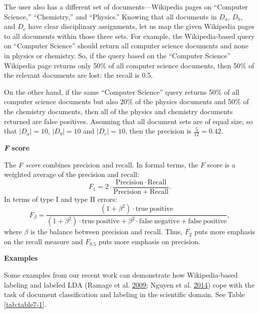 \documentclass[]{krantz}
\begin{document}
The user also has a different set of documents---Wikipedia pages on
``Computer Science,'' ``Chemistry,'' and ``Physics.'' Knowing that all
documents in \(D_a\), \(D_b\), and \(D_c\) have clear disciplinary
assignments, let us map the given Wikipedia pages to all documents
within those three sets. For example, the Wikipedia-based query on
``Computer Science'' should return all computer science documents and
none in physics or chemistry. So, if the query based on the ``Computer
Science'' Wikipedia page returns only 50\% of all computer science
documents, then 50\% of the relevant documents are lost: the recall is
0.5.

On the other hand, if the same ``Computer Science'' query returns 50\%
of all computer science documents but also 20\% of the physics documents
and 50\% of the chemistry documents, then all of the physics and
chemistry documents returned are false positives. Assuming that all
document sets are of equal size, so that \(|D_a| = 10\), \(|D_b|=10\)
and \(|D_c| = 10\), then the precision is \(\frac{5}{12} = 0.42\).

\textbf{\emph{F} score}

The \emph{F score} combines precision and recall. In formal terms, the
\(F\) score is a weighted average of the precision and recall:
\[\label{eq:text:F1}
F_1 = 2\cdot \frac{\mathrm{Precision}\cdot \mathrm{Recall}}{\mathrm{Precision}+\mathrm{Recall}}.\]
In terms of type I and type II errors:
\[F_\beta = \frac{(1+\beta^2)\cdot \mathrm{true\ positive}}{(1+\beta^2)\cdot \mathrm{true\ positive} + \beta^2\cdot \mathrm{false\ negative} + \mathrm{false\ positive}},\]
where \(\beta\) is the balance between precision and recall. Thus,
\(F_2\) puts more emphasis on the recall measure and \(F_{0.5}\) puts
more emphasis on precision.

\textbf{Examples}

Some examples from our recent work can demonstrate how Wikipedia-based
labeling and labeled LDA (Ramage et al.
\protect\hyperlink{ref-ramage-09}{2009}; Nguyen et al.
\protect\hyperlink{ref-Nguyen:Boyd-Graber:Resnik:Chang-2014}{2014}) cope
with the task of document classification and labeling in the scientific
domain. See Table \ref{tab:table7-1}.
\end{document}

